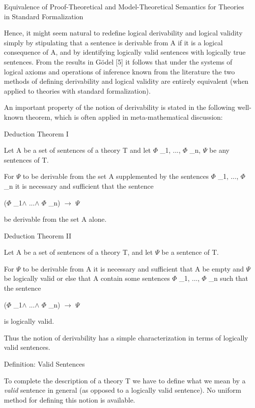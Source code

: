 \protect\hypertarget{anchor-19}{}{}Equivalence of Proof-Theoretical and
Model-Theoretical Semantics for Theories in Standard Formalization

Hence, it might seem natural to redefine logical derivability and
logical validity simply by stipulating that a sentence is derivable from
A if it is a logical consequence of A, and by identifying logically
valid sentences with logically true sentences. From the results in Gödel
{[}5{]} it follows that under the systems of logical axioms and
operations of inference known from the literature the two methods of
defining derivability and logical validity are entirely equivalent (when
applied to theories with standard formalization).

An important property of the notion of derivability is stated in the
following well-known theorem, which is often applied in
meta-mathematical discussion:

\protect\hypertarget{anchor-20}{}{}Deduction Theorem I

Let A be a set of sentences of a theory T and let $\Phi$ \_1, ..., $\Phi$ \_n, $\Psi$  be
any sentences of T.

For $\Psi$  to be derivable from the set A supplemented by the sentences $\Phi$ \_1,
..., $\Phi$ \_n it is necessary and sufficient that the sentence

($\Phi$ \_1$\land$ ...$\land$ $\Phi$ \_n) $\to$  $\Psi$

be derivable from the set A alone.

\protect\hypertarget{anchor-21}{}{}Deduction Theorem II

Let A be a set of sentences of a theory T, and let $\Psi$  be a sentence of T.

For $\Psi$  to be derivable from A it is necessary and sufficient that A be
empty and $\Psi$  be logically valid or else that A contain some sentences
$\Phi$ \_1, ..., $\Phi$ \_n such that the sentence

($\Phi$ \_1$\land$ ...$\land$ $\Phi$ \_n) $\to$  $\Psi$

is logically valid.

Thus the notion of derivability has a simple characterization in terms
of logically valid sentences.

\protect\hypertarget{anchor-22}{}{}Definition: Valid Sentences

To complete the description of a theory T we have to define what we mean
by a \emph{valid} sentence in general (as opposed to a logically valid
sentence). No uniform method for defining this notion is available.

